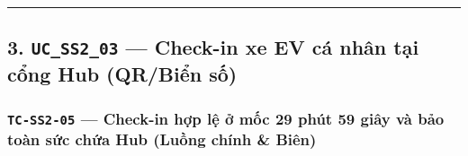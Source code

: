 \documentclass[11pt,a4paper]{article}
\begin{document}
\begin{center}\rule{0.5\linewidth}{0.5pt}\end{center}

\hypertarget{uc_ss2_03-check-in-xe-ev-cuxe1-nhuxe2n-tux1ea1i-cux1ed5ng-hub-qrbiux1ec3n-sux1ed1}{%
\subsection{\texorpdfstring{3. \texttt{UC\_SS2\_03} --- Check-in xe EV
cá nhân tại cổng Hub (QR/Biển
số)}{3. UC\_SS2\_03 --- Check-in xe EV cá nhân tại cổng Hub (QR/Biển số)}}\label{uc_ss2_03-check-in-xe-ev-cuxe1-nhuxe2n-tux1ea1i-cux1ed5ng-hub-qrbiux1ec3n-sux1ed1}}

\hypertarget{tc-ss2-05-check-in-hux1ee3p-lux1ec7-ux1edf-mux1ed1c-29-phuxfat-59-giuxe2y-vuxe0-bux1ea3o-touxe0n-sux1ee9c-chux1ee9a-hub-luux1ed3ng-chuxednh-biuxean}{%
\subsubsection{\texorpdfstring{\texttt{TC-SS2-05} --- Check-in hợp lệ ở
mốc 29 phút 59 giây và bảo toàn sức chứa Hub (Luồng chính \&
Biên)}{TC-SS2-05 --- Check-in hợp lệ ở mốc 29 phút 59 giây và bảo toàn sức chứa Hub (Luồng chính \& Biên)}}\label{tc-ss2-05-check-in-hux1ee3p-lux1ec7-ux1edf-mux1ed1c-29-phuxfat-59-giuxe2y-vuxe0-bux1ea3o-touxe0n-sux1ee9c-chux1ee9a-hub-luux1ed3ng-chuxednh-biuxean}}
\end{document}
